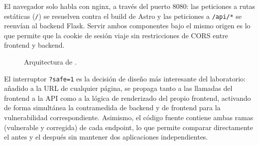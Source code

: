 El navegador solo habla con nginx, a través del puerto 8080: las
peticiones a rutas estáticas (\verb|/|) se resuelven contra el build de
Astro y las peticiones a \verb|/api/*| se reenvían al backend Flask. Servir
ambos componentes bajo el mismo origen es lo que permite que la cookie de
sesión viaje sin restricciones de CORS entre frontend y backend.

\begin{figure}[htbp]
  \centering
  \caption{Arquitectura de \breachlab.}
  \label{fig:arquitectura}
\end{figure}

El interruptor \texttt{?safe=1} es la decisión de diseño más interesante del
laboratorio: añadido a la URL de cualquier página, se propaga tanto a las
llamadas del frontend a la API como a la lógica de renderizado del propio
frontend, activando de forma simultánea la contramedida de backend y de
frontend para la vulnerabilidad correspondiente. Asimismo, el
código fuente contiene ambas ramas (vulnerable y corregida) de cada
endpoint, lo que permite comparar directamente el antes y el después sin
mantener dos aplicaciones independientes.

